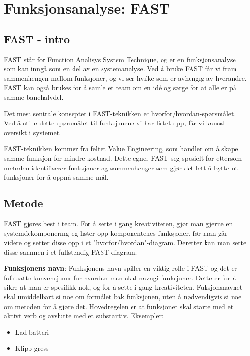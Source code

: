 \section{Funksjonsanalyse: FAST}
\label{sec:fast}

\subsection{FAST - intro}

FAST står for Function Analisys System Technique, og er en funksjonsanalyse som kan inngå som en del av en systemanalyse. Ved å bruke FAST får vi fram sammenhengen mellom funksjoner, og vi ser hvilke som er avhengig av hverandre. FAST kan også brukes for å samle et team om en idé og sørge for at alle er på samme banehalvdel.


Det mest sentrale konseptet i FAST-teknikken er hvorfor/hvordan-spørsmålet. Ved å stille dette spørsmålet til funksjonene vi har listet opp, får vi kausal-oversikt i systemet.

FAST-teknikken kommer fra feltet Value Engineering, som handler om å skape samme funksjon for mindre kostnad. Dette egner FAST seg spesielt for ettersom metoden identifiserer funksjoner og sammenhenger som gjør det lett å bytte ut funksjoner for å oppnå samme mål.

\subsection{Metode}

FAST gjøres best i team. For å sette i gang kreativiteten, gjør man gjerne en systemdekomponering og lister opp komponentenes funksjoner, før man går videre og setter disse opp i et "hvorfor/hvordan"-diagram. Deretter kan man sette disse sammen i et fullstendig FAST-diagram.

\textbf{Funksjonens navn}: Funksjonens navn spiller en viktig rolle i FAST og det er fafstsatte konvensjoner for hvordan man skal navngi funksjoner. Dette er for å sikre at man er spesifikk nok, og for å sette i gang kreativiteten.
Fuksjonsnavnet skal umiddelbart si noe om formålet bak funksjonen, uten å nødvendigvis si noe om metoden for å gjøre det. Hovedregelen er at funksjoner skal starte med et aktivt verb og avslutte med et substantiv. Eksempler:

\begin{itemize}
    \item Lad batteri
    \item Klipp gress
\end{itemize}

